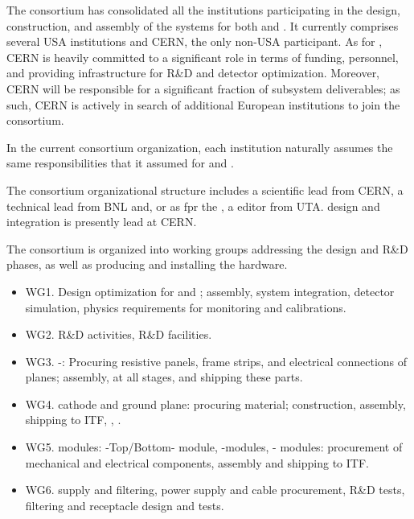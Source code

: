 The  consortium has consolidated all the institutions participating in the design, construction, and assembly of the  systems for both   and . 
%
It currently comprises several USA institutions and CERN, %
the only non-USA participant. As %
for , CERN is heavily committed to a significant role in terms of funding, personnel, 
 and providing infrastructure for R\&D and detector optimization. Moreover, CERN will be responsible for a significant fraction of subsystem deliverables; as such,  CERN is actively in search of additional European institutions to join the consortium. 
 
 In the  current consortium organization, each institution naturally assumes the same responsibilities that it assumed for %
 and .

The %
consortium organizational structure includes a scientific lead from CERN, a technical lead from BNL and, or as fpr the , a  editor from UTA.   design and integration  is presently lead at  CERN. 

 The consortium is organized into working groups addressing the design and  R\&D phases, as well as producing and installing the hardware.

\begin{itemize}
\item WG1. Design optimization for  and ; assembly, system integration, detector simulation, physics requirements for monitoring and calibrations. %
\item WG2. R\&D activities, R\&D facilities. %
\item WG3. -: Procuring resistive panels, frame strips, and electrical connections of planes; assembly,  at all stages, and shipping these parts. %
\item WG4.  cathode and ground plane:  procuring material; construction, assembly, shipping to ITF, , .%
\item WG5.  modules: -Top/Bottom- module, -\endwall modules, - modules: procurement of mechanical and electrical components, assembly and shipping to ITF. %
\item WG6.  supply and filtering,  power supply and cable procurement, R\&D tests, filtering and receptacle design and tests. %
\end{itemize}

